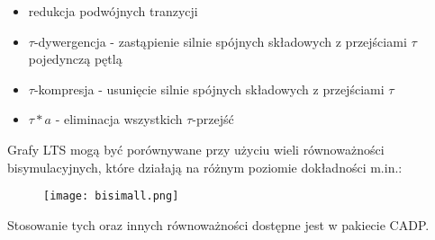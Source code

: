 \documentclass[a4paper,15pt]{article}
\begin{document}
\begin{itemize}
\item redukcja podwójnych tranzycji
\item $\tau$-dywergencja - zastąpienie silnie spójnych składowych z przejściami $\tau$ pojedynczą pętlą
\item $\tau$-kompresja - usunięcie silnie spójnych składowych z przejściami $\tau$
\item $\tau*a$ - eliminacja wszystkich $\tau$-przejść
\end{itemize}

Grafy LTS mogą być porównywane przy użyciu wieli równoważności bisymulacyjnych, które działają na różnym poziomie dokładności m.in.: 

\begin{figure}[H]
\centerline{\texttt{[image: bisimall.png]}}
\end{figure}

Stosowanie tych oraz innych równoważności dostępne jest w pakiecie CADP.
\end{document}
